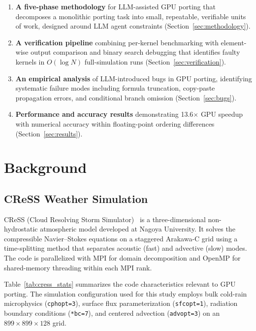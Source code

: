 \documentclass[conference]{IEEEtran}
\begin{document}
\begin{enumerate}
\item \textbf{A five-phase methodology} for LLM-assisted GPU porting that
  decomposes a monolithic porting task into small, repeatable, verifiable
  units of work, designed around LLM agent constraints
  (Section~\ref{sec:methodology}).

\item \textbf{A verification pipeline} combining per-kernel benchmarking with
  element-wise output comparison and binary search debugging that identifies
  faulty kernels in $O(\log N)$ full-simulation runs
  (Section~\ref{sec:verification}).

\item \textbf{An empirical analysis} of LLM-introduced bugs in GPU porting,
  identifying systematic failure modes including formula truncation,
  copy-paste propagation errors, and conditional branch omission
  (Section~\ref{sec:bugs}).

\item \textbf{Performance and accuracy results} demonstrating 13.6$\times$
  GPU speedup with numerical accuracy within floating-point ordering
  differences (Section~\ref{sec:results}).
\end{enumerate}

\section{Background}
\label{sec:background}

\subsection{CReSS Weather Simulation}

CReSS (Cloud Resolving Storm Simulator)~\cite{ref:cress} is a
three-dimensional non-hydrostatic atmospheric model developed at Nagoya
University. It solves the compressible Navier--Stokes equations on a
staggered Arakawa-C grid using a time-splitting method that separates
acoustic (fast) and advective (slow) modes. The code is parallelized with
MPI for domain decomposition and OpenMP for shared-memory threading within
each MPI rank.

Table~\ref{tab:cress_stats} summarizes the code characteristics relevant to
GPU porting. The simulation configuration used for this study employs bulk
cold-rain microphysics (\texttt{cphopt=3}), surface flux parameterization
(\texttt{sfcopt=1}), radiation boundary conditions (\texttt{*bc=7}), and
centered advection (\texttt{advopt=3}) on an $899 \times 899 \times 128$
grid.
\end{document}
